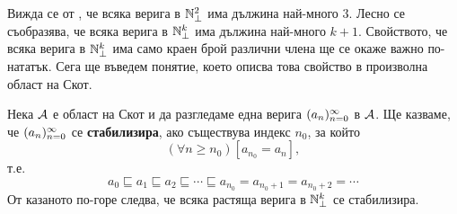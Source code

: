 Вижда се от , че всяка верига в $\mathbb{N}^2_\bot$ има дължина най-много $3$.
Лесно се съобразява, че всяка верига в $\mathbb{N}^k_\bot$ има дължина най-много $k+1$.
Свойството, че всяка верига в $\mathbb{N}^k_\bot$ има само краен брой различни члена
ще се окаже важно по-нататък. Сега ще въведем понятие, което описва това свойство в произволна област на Скот.

Нека $\mathcal{A}$ е област на Скот и да разгледаме една верига $(a_{n})^{\infty}_{n=0}$ в $\mathcal{A}$.
Ще казваме, че $(a_{n})^{\infty}_{n=0}$ се {\bf стабилизира}, ако съществува индекс $n_0$, за който
\[(\forall n \geq n_0)[a_{n_0} = a_{n}],\]
т.е.
\[a_0 \sqsubseteq a_1 \sqsubseteq a_2 \sqsubseteq \cdots \sqsubseteq a_{n_0} = a_{n_0+1} = a_{n_0+2} = \cdots\]
От казаното по-горе следва, че всяка растяща верига в $\mathbb{N}^k_\bot$ се стабилизира.



